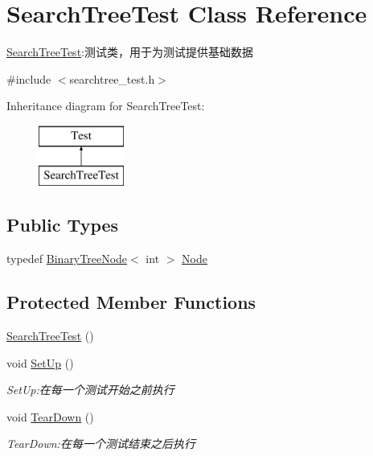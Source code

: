 \hypertarget{class_search_tree_test}{}\section{Search\+Tree\+Test Class Reference}
\label{class_search_tree_test}


\hyperlink{class_search_tree_test}{Search\+Tree\+Test}\+:测试类，用于为测试提供基础数据  




{\ttfamily \#include $<$searchtree\+\_\+test.\+h$>$}

Inheritance diagram for Search\+Tree\+Test\+:\begin{figure}[H]
\begin{center}
\leavevmode
\includegraphics[height=2.000000cm]{class_search_tree_test}
\end{center}
\end{figure}
\subsection*{Public Types}
\begin{DoxyCompactItemize}
\item 
typedef \hyperlink{struct_introduction_to_algorithm_1_1_tree_algorithm_1_1_binary_tree_node}{Binary\+Tree\+Node}$<$ int $>$ \hyperlink{class_search_tree_test_a921d5813f947eb9b70417b69722bc050}{Node}
\end{DoxyCompactItemize}
\subsection*{Protected Member Functions}
\begin{DoxyCompactItemize}
\item 
\hyperlink{class_search_tree_test_a8499bee6e18b14298bb210e067d04e99}{Search\+Tree\+Test} ()
\item 
void \hyperlink{class_search_tree_test_a90a211d1322c06e96bee25849525c77f}{Set\+Up} ()
\begin{DoxyCompactList}\small\item\em Set\+Up\+:在每一个测试开始之前执行 \end{DoxyCompactList}\item 
void \hyperlink{class_search_tree_test_a2fff7db7a798909e087a66ce890f4f49}{Tear\+Down} ()
\begin{DoxyCompactList}\small\item\em Tear\+Down\+:在每一个测试结束之后执行 \end{DoxyCompactList}\end{DoxyCompactItemize}
